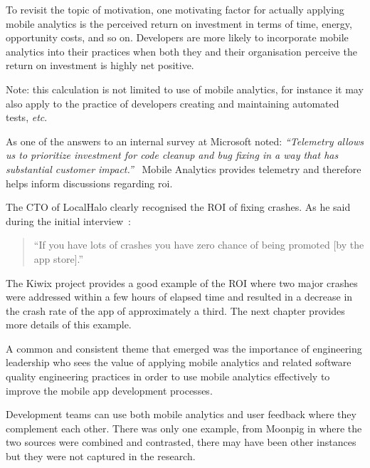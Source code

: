 To revisit the topic of motivation, one motivating factor for actually applying mobile analytics is the perceived return on investment in terms of time, energy, opportunity costs, and so on. Developers are more likely to incorporate mobile analytics into their practices when both they and their organisation perceive the return on investment is highly net positive.

\begin{kaobox}[frametitle=ROI in software development]
Note: this calculation is not limited to use of mobile analytics, for instance it may also apply to the practice of developers creating and maintaining automated tests, \textit{etc}.

As one of the answers to an internal survey at Microsoft noted: \emph{``Telemetry allows us to prioritize investment for code
cleanup and bug fixing in a way that has substantial
customer impact.''}~ Mobile Analytics provides telemetry and therefore helps inform discussions regarding \Gls{roi}. 
\end{kaobox}


The CTO of LocalHalo clearly recognised the ROI of fixing crashes. As he said during the initial interview~: 

\begin{quote}
    ``If you have lots of crashes you have zero chance of being promoted [by the app store].''
\end{quote}

The Kiwix project provides a good example of the ROI where two major crashes were addressed within a few hours of elapsed time and resulted in a decrease in the crash rate of the app of approximately a third. The next chapter provides more details of this example.

A common and consistent theme that emerged was the importance of engineering leadership who sees the value of applying mobile analytics and related software quality engineering practices in order to use mobile analytics effectively to improve the mobile app development processes. 

Development teams can use both mobile analytics and user feedback where they complement each other. There was only one example, from Moonpig in  where the two sources were combined and contrasted, there may have been other instances but they were not captured in the research. 

